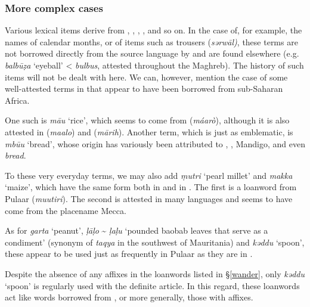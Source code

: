 \documentclass[output=paper]{langsci/langscibook}
\begin{document}
\subsubsection{More complex cases} %

 \label{wander}

Various  lexical items derive from , , , , and so on. In the case of, for example, the names of calendar months, or of items such as trousers (\textit{sərwāl)}, these terms are not borrowed directly from the {source language} by  and are found elsewhere (e.g. \textit{balbūẓa} ‘eyeball’ <  \textit{bulbus}, attested throughout the Maghreb). The history of such items will not be dealt with here. We can, however, mention the case of some well-attested terms in  that appear to have been borrowed from sub-Saharan Africa.

One such is \textit{mā{\R}u} ‘rice’, which seems to come from  (\textit{máarò}), although it is also attested in  (\textit{maalo}) and  (\textit{mārih}). Another term, which is just as emblematic, is \textit{mbū{\R}u} ‘bread’, whose origin has variously been attributed to , , Mandigo, and even  \textit{bread}.

To these very everyday terms, we may also add \textit{ṃutri} ‘pearl millet’ and \textit{makka} ‘maize’, which have the same form both in  and in . The first is a {loanword} from Pulaar (\textit{muutiri}). The second is attested in many languages and seems to have come from the placename {Mecca}. 

As for \textit{garta} ‘peanut’, \textit{ḷāḷo} \~{} \textit{ḷaḷu} ‘pounded baobab leaves that serve as a condiment’ (synonym of \textit{taqya} in the southwest of Mauritania) and \textit{kəddu} ‘spoon’, these appear to be used just as frequently in Pulaar as they are in . 


Despite the absence of any  affixes in the {loanwords} listed in §\ref{wander}, only \textit{kəddu} ‘spoon’ is regularly used with the {definite} {article}. In this regard, these {loanwords} act like words borrowed from , or more generally, those with  affixes. 
\end{document}
